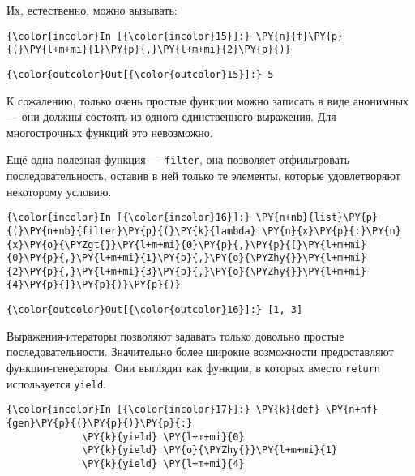     Их, естественно, можно вызывать:

    \begin{Verbatim}[commandchars=\\\{\}]
{\color{incolor}In [{\color{incolor}15}]:} \PY{n}{f}\PY{p}{(}\PY{l+m+mi}{1}\PY{p}{,}\PY{l+m+mi}{2}\PY{p}{)}
\end{Verbatim}


\begin{Verbatim}[commandchars=\\\{\}]
{\color{outcolor}Out[{\color{outcolor}15}]:} 5
\end{Verbatim}
            
    К сожалению, только очень простые функции можно записать в виде
анонимных --- они должны состоять из одного единственного выражения. Для
многострочных функций это невозможно.

Ещё одна полезная функция --- \texttt{filter}, она позволяет отфильтровать
последовательность, оставив в ней только те элементы, которые
удовлетворяют некоторому условию.

    \begin{Verbatim}[commandchars=\\\{\}]
{\color{incolor}In [{\color{incolor}16}]:} \PY{n+nb}{list}\PY{p}{(}\PY{n+nb}{filter}\PY{p}{(}\PY{k}{lambda} \PY{n}{x}\PY{p}{:}\PY{n}{x}\PY{o}{\PYZgt{}}\PY{l+m+mi}{0}\PY{p}{,}\PY{p}{[}\PY{l+m+mi}{0}\PY{p}{,}\PY{l+m+mi}{1}\PY{p}{,}\PY{o}{\PYZhy{}}\PY{l+m+mi}{2}\PY{p}{,}\PY{l+m+mi}{3}\PY{p}{,}\PY{o}{\PYZhy{}}\PY{l+m+mi}{4}\PY{p}{]}\PY{p}{)}\PY{p}{)}
\end{Verbatim}


\begin{Verbatim}[commandchars=\\\{\}]
{\color{outcolor}Out[{\color{outcolor}16}]:} [1, 3]
\end{Verbatim}
            
    Выражения-итераторы позволяют задавать только довольно простые
последовательности. Значительно более широкие возможности предоставляют
функции-генераторы. Они выглядят как функции, в которых вместо
\texttt{return} используется \texttt{yield}.

    \begin{Verbatim}[commandchars=\\\{\}]
{\color{incolor}In [{\color{incolor}17}]:} \PY{k}{def} \PY{n+nf}{gen}\PY{p}{(}\PY{p}{)}\PY{p}{:}
             \PY{k}{yield} \PY{l+m+mi}{0}
             \PY{k}{yield} \PY{o}{\PYZhy{}}\PY{l+m+mi}{1}
             \PY{k}{yield} \PY{l+m+mi}{4}
\end{Verbatim}


